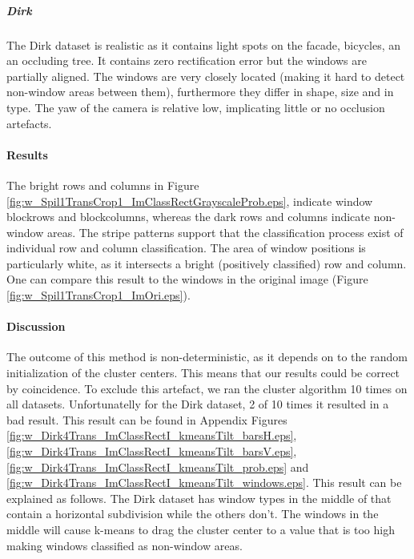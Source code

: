 \subparagraph{Dirk}
The Dirk dataset is realistic as it contains light spots on the facade,
bicycles, an an occluding tree.  It contains zero rectification error but the
windows are partially aligned.  The windows are very closely located (making it
hard to detect non-window areas between them), furthermore they differ in shape, size
and in type.  The yaw of the camera is relative low, implicating little or no
occlusion artefacts.

\newpage
\paragraph{Results} %
\clearpage

The bright rows and columns in Figure
\ref{fig:w_Spil1TransCrop1_ImClassRectGrayscaleProb.eps},  indicate window
blockrows and blockcolumns, whereas the dark rows and columns indicate
non-window areas.
The stripe patterns support that the classification process exist of individual
row and column classification.
The area of window positions is particularly white, as it 
intersects a bright (positively classified) row and column.
One can compare this result to the windows in the original image 
(Figure \ref{fig:w_Spil1TransCrop1_ImOri.eps}).



\paragraph{Discussion}  %
The outcome of this method is non-deterministic, as it depends on to the random
initialization of the cluster centers. This means that our results could be
correct by coincidence.  To exclude this artefact, we ran the cluster algorithm
10 times on all datasets. Unfortunatelly for the Dirk dataset, 2 of 10 times it 
resulted in a bad result. This result can be found in Appendix
Figures \ref{fig:w_Dirk4Trans_ImClassRectI_kmeansTilt_barsH.eps},
\ref{fig:w_Dirk4Trans_ImClassRectI_kmeansTilt_barsV.eps},
\ref{fig:w_Dirk4Trans_ImClassRectI_kmeansTilt_prob.eps} and
\ref{fig:w_Dirk4Trans_ImClassRectI_kmeansTilt_windows.eps}.
This result can be explained as follows. The Dirk dataset has window types in the
middle of that contain a horizontal subdivision while the others don't.
The windows in the middle will cause k-means to drag the cluster center to a
value that is too high making windows classified as non-window areas.


